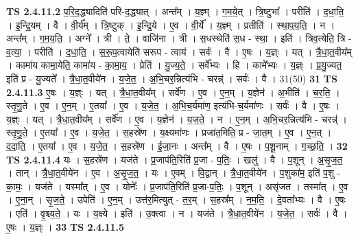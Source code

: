 \documentclass[17pt]{extarticle}
\begin{document}
                  \newline
                                \textbf{ TS 2.4.11.2} \newline
                  प॒रि॒द॒द्ध्यादिति॑ परि-द॒द्ध्यात् । अन्त᳚म् । य॒ज्ञ्म् । ग॒म॒ये॒त् । त्रि॒ष्टुभा᳚ । परीति॑ । द॒धा॒ति॒ । इ॒न्द्रि॒यम् । वै । वी॒र्य᳚म् । त्रि॒ष्टुक् । इ॒न्द्रि॒ये । ए॒व । वी॒र्ये᳚ । य॒ज्ञ्म् । प्रतीति॑ । स्था॒प॒य॒ति॒ । न । अन्त᳚म् । ग॒म॒य॒ति॒ । अग्ने᳚ । त्री । ते॒ । वाजि॑ना । त्री । स॒धस्थेति॑ स॒ध - स्था॒ । इति॑ । त्रिव॒त्येति॒ त्रि - व॒त्या॒ । परीति॑ । द॒धा॒ति॒ । स॒रू॒प॒त्वायेति॑ सरूप - त्वाय॑ । सर्वः॑ । वै । ए॒षः । य॒ज्ञ्ः । यत् । त्रै॒धा॒त॒वीय᳚म् । कामा॑य कामा॒येति॒ कामा॑य - का॒मा॒य॒ । प्रेति॑ । यु॒ज्य॒ते॒ । सर्वे᳚भ्यः । हि । कामे᳚भ्यः । य॒ज्ञ्ः । प्र॒यु॒ज्यत॒ इति॑ प्र - यु॒ज्यते᳚ । त्रै॒धा॒त॒वीये॑न । य॒जे॒त॒ । अ॒भि॒चर॒न्नित्य॑भि - चरन्न्॑ । सर्वः॑ । वै । 31(50) \textbf{  31} \newline
                  \newline
                                \textbf{ TS 2.4.11.3} \newline
                  ए॒षः । य॒ज्ञ्ः । यत् । त्रै॒धा॒त॒वीय᳚म् ।   सर्वे॑ण । ए॒व । ए॒न॒म् । य॒ज्ञेन॑ । अ॒भीति॑ । च॒र॒ति॒ । स्तृ॒णु॒ते । ए॒व । ए॒न॒म् । ए॒तया᳚ ।   ए॒व । य॒जे॒त॒ । अ॒भि॒च॒र्यमा॑ण॒ इत्य॑भि-च॒र्यमा॑णः । सर्वः॑ । वै । ए॒षः । य॒ज्ञ्ः । यत् । त्रै॒धा॒त॒वीय᳚म् । सर्वे॑ण । ए॒व । य॒ज्ञेन॑ । य॒ज॒ते॒ । न । ए॒न॒म् । अ॒भि॒चर॒न्नित्य॑भि - चरन्न्॑ । स्तृ॒णु॒ते॒ । ए॒तया᳚ । ए॒व । य॒जे॒त॒ । स॒हस्रे॑ण । य॒क्ष्यमा॑णः । प्रजा॑त॒मिति॒ प्र - जा॒त॒म् । ए॒व । ए॒न॒त् । द॒दा॒ति॒ । ए॒तया᳚ । ए॒व । य॒जे॒त॒ । स॒हस्रे॑ण । ई॒जा॒नः । अन्त᳚म् । वै । ए॒षः । प॒शू॒नाम् । ग॒च्छ॒ति॒ । \textbf{  32} \newline
                  \newline
                                \textbf{ TS 2.4.11.4} \newline
                  यः । स॒हस्रे॑ण । यज॑ते । प्र॒जाप॑ति॒रिति॑ प्र॒जा - प॒तिः॒ । खलु॑ । वै । प॒शून् । अ॒सृ॒ज॒त॒ । तान् । त्रै॒धा॒त॒वीये॑न । ए॒व । अ॒सृ॒ज॒त॒ । यः ।   ए॒वम् । वि॒द्वान् । त्रै॒धा॒त॒वीये॑न । प॒शुका॑म॒ इति॑ प॒शु - का॒मः॒ । यज॑ते । यस्मा᳚त् । ए॒व । योनेः᳚ । प्र॒जाप॑ति॒रिति॑ प्र॒जा-प॒तिः॒ । प॒शून् । असृ॑जत । तस्मा᳚त् । ए॒व । ए॒ना॒न् । सृ॒ज॒ते॒ । उपेति॑ । ए॒न॒म् । उत्त॑र॒मित्युत् - त॒र॒म् । स॒हस्र᳚म् । न॒म॒ति॒ । दे॒वता᳚भ्यः । वै । ए॒षः । एति॑ । वृ॒श्च्य॒ते॒ । यः । य॒क्ष्ये । इति॑ । उ॒क्त्वा । न । यज॑ते । त्रै॒धा॒त॒वीये॑न । य॒जे॒त॒ । सर्वः॑ । वै । ए॒षः । य॒ज्ञ्ः । \textbf{  33} \newline
                  \newline
                                \textbf{ TS 2.4.11.5} \newline
\end{document}
